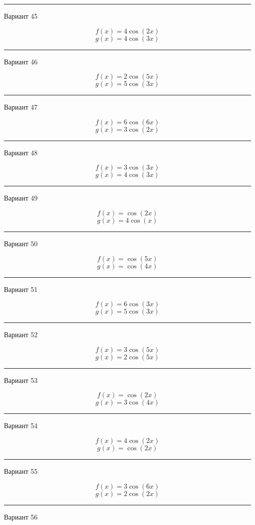 \documentclass[11pt]{report}
\begin{document}
\rule{\textwidth}{.2mm}

Вариант 45

$$f(x)=4 \cos{\left(2 x \right)}$$
$$g(x)=4 \cos{\left(3 x \right)}$$

\rule{\textwidth}{.2mm}

Вариант 46

$$f(x)=2 \cos{\left(5 x \right)}$$
$$g(x)=5 \cos{\left(3 x \right)}$$

\rule{\textwidth}{.2mm}

Вариант 47

$$f(x)=6 \cos{\left(6 x \right)}$$
$$g(x)=3 \cos{\left(2 x \right)}$$

\rule{\textwidth}{.2mm}

Вариант 48

$$f(x)=3 \cos{\left(3 x \right)}$$
$$g(x)=4 \cos{\left(3 x \right)}$$

\rule{\textwidth}{.2mm}

Вариант 49

$$f(x)=\cos{\left(2 x \right)}$$
$$g(x)=4 \cos{\left(x \right)}$$

\rule{\textwidth}{.2mm}

Вариант 50

$$f(x)=\cos{\left(5 x \right)}$$
$$g(x)=\cos{\left(4 x \right)}$$

\rule{\textwidth}{.2mm}

Вариант 51

$$f(x)=6 \cos{\left(3 x \right)}$$
$$g(x)=5 \cos{\left(3 x \right)}$$

\rule{\textwidth}{.2mm}

Вариант 52

$$f(x)=3 \cos{\left(5 x \right)}$$
$$g(x)=2 \cos{\left(5 x \right)}$$

\rule{\textwidth}{.2mm}

Вариант 53

$$f(x)=\cos{\left(2 x \right)}$$
$$g(x)=3 \cos{\left(4 x \right)}$$

\rule{\textwidth}{.2mm}

Вариант 54

$$f(x)=4 \cos{\left(2 x \right)}$$
$$g(x)=\cos{\left(2 x \right)}$$

\rule{\textwidth}{.2mm}

Вариант 55

$$f(x)=3 \cos{\left(6 x \right)}$$
$$g(x)=2 \cos{\left(2 x \right)}$$

\rule{\textwidth}{.2mm}

Вариант 56
\end{document}

